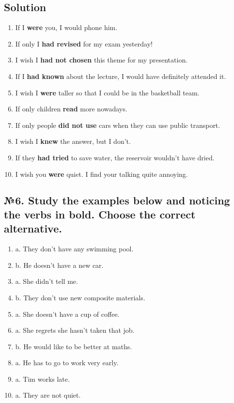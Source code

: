 \subsection*{Solution}
\begin{enumerate}
      \item If I \textbf{were} you, I would phone him.
      \item If only I \textbf{had revised} for my exam yesterday!
      \item I wish I \textbf{had not chosen} this theme for my presentation.
      \item If I \textbf{had known} about the lecture, I would have definitely attended it.
      \item I wish I \textbf{were} taller so that I could be in the basketball team.
      \item If only children \textbf{read} more nowadays.
      \item If only people \textbf{did not use} cars when they can use public transport.
      \item I wish I \textbf{knew} the answer, but I don’t.
      \item If they \textbf{had tried} to save water, the reservoir wouldn’t have dried.
      \item I wish you \textbf{were} quiet. I find your talking quite annoying.
\end{enumerate}

\subsection*{№6. Study the examples below and noticing the verbs in bold. Choose the correct alternative.}

\begin{enumerate}
      \item a. They don’t have any swimming pool.
      \item b. He doesn’t have a new car.
      \item a. She didn’t tell me.
      \item b. They don’t use new composite materials.
      \item a. She doesn’t have a cup of coffee.
      \item a. She regrets she hasn’t taken that job.
      \item b. He would like to be better at maths.
      \item a. He has to go to work very early.
      \item a. Tim works late.
      \item a. They are not quiet.
\end{enumerate}


